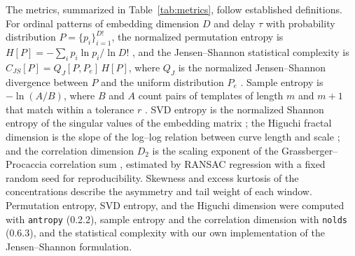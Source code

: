 \documentclass[a4paper,fleqn]{cas-sc}
\begin{document}
The metrics, summarized in Table~\ref{tab:metrics}, follow established definitions. For ordinal patterns of embedding dimension $D$ and delay $\tau$ with probability distribution $P=\{p_i\}_{i=1}^{D!}$, the normalized permutation entropy is $H[P]=-\sum_i p_i\ln p_i/\ln D!$ \citep{Bandt2002}, and the Jensen--Shannon statistical complexity is $C_{JS}[P]=Q_J[P,P_e]\,H[P]$, where $Q_J$ is the normalized Jensen--Shannon divergence between $P$ and the uniform distribution $P_e$ \citep{Lamberti2004, Rosso2007}. Sample entropy is $-\ln(A/B)$, where $B$ and $A$ count pairs of templates of length $m$ and $m+1$ that match within a tolerance $r$ \citep{Richman2000}. SVD entropy is the normalized Shannon entropy of the singular values of the embedding matrix \citep{Roberts1999}; the Higuchi fractal dimension is the slope of the log--log relation between curve length and scale \citep{Higuchi1988}; and the correlation dimension $D_2$ is the scaling exponent of the Grassberger--Procaccia correlation sum \citep{Grassberger1983}, estimated by RANSAC regression with a fixed random seed for reproducibility. Skewness and excess kurtosis of the concentrations describe the asymmetry and tail weight of each window. Permutation entropy, SVD entropy, and the Higuchi dimension were computed with \texttt{antropy} (0.2.2), sample entropy and the correlation dimension with \texttt{nolds} (0.6.3), and the statistical complexity with our own implementation of the Jensen--Shannon formulation.
\end{document}
